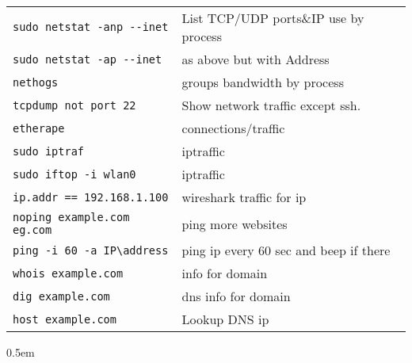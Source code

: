 \documentclass[fontsize=6pt,paper=a4,paper=landscape,twoside=false,parskip=half,
headings=small,numbers=withenddot,usegeometry=true,english]{scrartcl}
\providecommand{\sectionbox}[1]{{\fboxsep0.5em\hspace*{-1.5\fboxsep}%
 \fcolorbox{gray}{gray!3}{%
 \parbox{\columnwidth}{%
 \raggedright #1}}}}
\begin{document}
\begin{multicols}{4}
{\begin{tabular}{@{}ll@{}}
		\texttt{sudo netstat -anp -{}-inet}  &  List TCP/UDP ports\&IP use by process\\
		\texttt{sudo netstat -ap -{}-inet}  &  as above but with Address\\
		\texttt{nethogs}  &  groups bandwidth by process\\
		\texttt{tcpdump not port 22}  &  Show network traffic except ssh.\\
		\texttt{etherape}  &  connections/traffic\\
		\texttt{sudo iptraf}  &  iptraffic\\
		\texttt{sudo iftop -i wlan0}  &  iptraffic\\
		\texttt{ip.addr == 192.168.1.100}  &  wireshark traffic for ip\\
		\texttt{noping example.com eg.com}  &  ping more websites\\
		\texttt{ping -i 60 -a IP\textbackslash address}  &  ping ip every 60 sec and beep if there\\
		\texttt{whois example.com}  &  info for domain\\
		\texttt{dig example.com}  &  dns info for domain\\
		\texttt{host example.com}  &  Lookup DNS ip\\
			\bottomrule
	\end{tabular}
}

\sectionbox{
}
\end{multicols}
\end{document}
